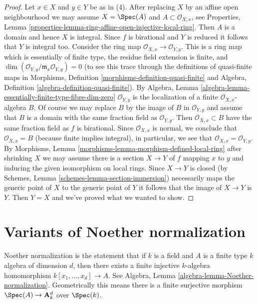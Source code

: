 \begin{proof}
\medskip\noindent
Let $x \in X$ and $y \in Y$ be as in (4). After replacing $X$
by an affine open neighbourhood we may assume $X = \Spec(A)$
and $A \subset \mathcal{O}_{X, x}$, see
Properties, Lemma \ref{properties-lemma-ring-affine-open-injective-local-ring}.
Then $A$ is a domain and hence $X$ is integral.
Since $f$ is birational and $Y$ is reduced
it follows that $Y$ is integral too. Consider the ring map
$\mathcal{O}_{X, x} \to \mathcal{O}_{Y, y}$. This is a ring map
which is essentially of finite type, the residue field extension
is finite, and $\dim(\mathcal{O}_{Y, y}/\mathfrak m_x\mathcal{O}_{Y, y}) = 0$
(to see this trace through the definitions of quasi-finite
maps in
Morphisms, Definition \ref{morphisms-definition-quasi-finite} and
Algebra, Definition \ref{algebra-definition-quasi-finite}). By
Algebra, Lemma \ref{algebra-lemma-essentially-finite-type-fibre-dim-zero}
$\mathcal{O}_{Y, y}$ is the localization of a finite
$\mathcal{O}_{X, x}$-algebra $B$. Of course we may replace
$B$ by the image of $B$ in $\mathcal{O}_{Y, y}$ and assume
that $B$ is a domain with the same fraction field as $\mathcal{O}_{Y, y}$.
Then $\mathcal{O}_{X, x} \subset B$
have the same fraction field as $f$ is birational. Since
$\mathcal{O}_{X, x}$ is normal, we conclude that
$\mathcal{O}_{X, x} = B$ (because finite implies integral),
in particular, we see that $\mathcal{O}_{X, x} = \mathcal{O}_{Y, y}$. By
Morphisms, Lemma \ref{morphisms-lemma-morphism-defined-local-ring}
after shrinking $X$ we may assume there is a section
$X \to Y$ of $f$ mapping $x$ to $y$ and inducing the given
isomorphism on local rings. Since $X \to Y$ is closed
(by Schemes, Lemma \ref{schemes-lemma-section-immersion})
necessarily maps the generic point of $X$ to the generic point of $Y$
it follows that the image of $X \to Y$ is $Y$.
Then $Y = X$ and we've proved what we wanted to show.
\end{proof}

\section{Variants of Noether normalization}
\label{varieties-section-noether-normalization}
Noether normalization is the statement that if $k$ is a field
and $A$ is a finite type $k$ algebra of dimension $d$, then
there exists a finite injective $k$-algebra homomorphism
$k[x_1, \ldots, x_d] \to A$. See
Algebra, Lemma \ref{algebra-lemma-Noether-normalization}.
Geometrically this means there
is a finite surjective morphism $\Spec(A) \to \mathbf{A}^d_k$
over $\Spec(k)$.

